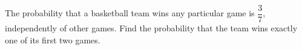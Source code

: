 The probability that a basketball team wins any particular game is $\dfrac{3}{7}$, independently of other games. Find the probability that the team wins exactly one of its first two games.
